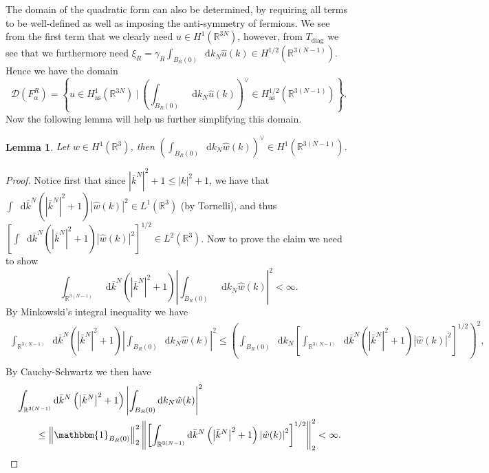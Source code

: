 \documentclass[a4paper,11pt]{article}
\newcommand{\norm}[1]{\left\lVert #1 \right\rVert}
\newcommand{\abs}[1]{\left\lvert #1 \right\rvert}
\newcommand*\diff{\mathop{}\!\mathrm{d}}
\newcommand{\R}{\mathbb{R}}
\newtheorem{lemma}{Lemma}
\numberwithin{equation}{section}
\begin{document}
The domain of the quadratic form can also be determined, by requiring all terms to be well-defined as well as imposing the anti-symmetry of fermions. We see from the first term that we clearly need $ u\in H^1(\R^{3N}) $, however, from $ T_{\text{diag}} $ we see that we furthermore need $ \xi_R=\gamma_R\int_{B_R(0)} \diff k_N \hat{u}(k)\in H^{1/2}\left(\R^{3(N-1)}\right) $. Hence we have the domain\begin{equation}
\mathscr{D}(F_\alpha^R)=\left\{u\in H_{\text{as}}^1(\R^{3N})\ \Big\vert\ \left(\int_{B_R(0)}\diff k_N \hat{u}(k)\right)^\vee\in H_{\text{as}}^{1/2}\left(\R^{3(N-1)}\right)\right\}.
\end{equation}
Now the following lemma will help us further simplifying this domain.\begin{lemma}\label{lemma domain of FR}
	Let $ w\in H^1(\R^{3}) $, then $ \left(\int_{B_R(0)}\diff k_N \hat{w}(k)\right)^\vee\in H^1(\R^{3(N-1)}) $.
	\end{lemma}
	\begin{proof}
	Notice first that since $ \abs{\bar{k}^N}^2+1\leq\abs{k}^2+1 $, we have that $ \int \diff\bar{k}^N \left(\abs{\bar{k}^N}^2+1\right)\abs{\hat{w}(k)}^2\in L^1(\R^3)$ (by Tornelli), and thus  $ \left[\int \diff\bar{k}^N \left(\abs{\bar{k}^N}^2+1\right)\abs{\hat{w}(k)}^2\right]^{1/2}\in L^2(\R^3)$. Now to prove the claim we need to show\begin{equation}
	\int_{\R^{3(N-1)}} \diff \bar{k}^N \left(\abs{\bar{k}^N}^2+1\right)\left\lvert\int_{B_R(0)}\diff k_N \hat{w}(k)\right\rvert^2<\infty.
	\end{equation}	
	By Minkowski's integral inequality we have \begin{equation}
	\begin{aligned}
	\int_{\R^{3(N-1)}} \diff \bar{k}^N \left(\abs{\bar{k}^N}^2+1\right)\left\lvert\int_{B_R(0)}\diff k_N \hat{w}(k)\right\rvert^2\leq\left(\int_{B_R(0)}\diff k_N\left[\int_{\R^{3(N-1)}} \diff \bar{k}^N \left(\abs{\bar{k}^N}^2+1\right)\left\lvert \hat{w}(k)\right\rvert^2\right]^{1/2}\right)^2,\\
	\end{aligned}
	\end{equation}
	By Cauchy-Schwartz we then have \begin{equation}
	\begin{aligned}
	&\int_{\R^{3(N-1)}} \diff \bar{k}^N \left(\abs{\bar{k}^N}^2+1\right)\left\lvert\int_{B_R(0)}\diff k_N \hat{w}(k)\right\rvert^2\\&\qquad\leq\norm{\mathbbm{1}_{B_R(0)}}_2^2\norm{\left[\int_{\R^{3(N-1)}} \diff \bar{k}^N \left(\abs{\bar{k}^N}^2+1\right)\left\lvert \hat{w}(k)\right\rvert^2\right]^{1/2}}_2^2<\infty.
	\end{aligned}
	\end{equation}
	\end{proof}
\end{document}
